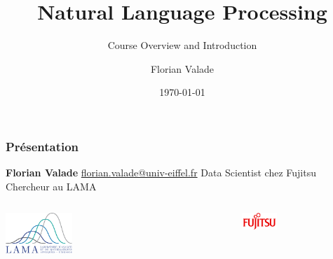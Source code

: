 \documentclass[aspectratio=169,11pt]{beamer}
\title{Natural Language Processing}
\subtitle{Course Overview and Introduction}
\author{Florian Valade}
\date{\today}
\begin{document}
\begin{frame}
    \titlepage
\end{frame}

\begin{frame}
    \frametitle{Présentation}
    \textbf{Florian Valade} \newline
    \href{mailto:florian.valade@univ-eiffel.fr}{florian.valade@univ-eiffel.fr} \newline
    Data Scientist chez Fujitsu \newline
    Chercheur au LAMA \newline
    \begin{columns}
        \begin{column}{0.5\textwidth}
            \begin{flushleft}
                \includegraphics[width=0.3\textwidth]{images/lama.png}
            \end{flushleft}
        \end{column}
        \begin{column}{0.5\textwidth}
            \begin{flushright}
                \includegraphics[width=0.3\textwidth]{images/fujitsu.png}
            \end{flushright}
        \end{column}
    \end{columns}
\end{frame}
\end{document}
